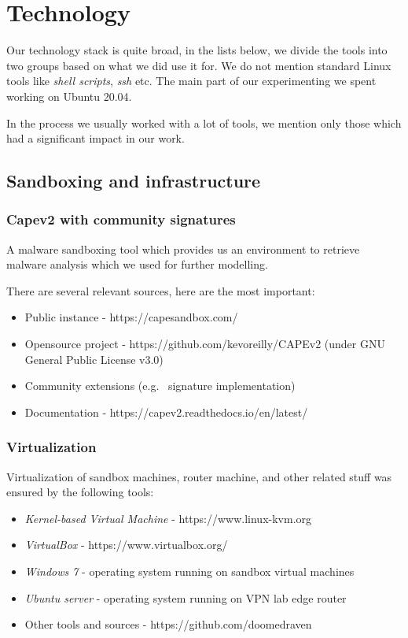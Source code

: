 \chapter{Technology} \label{app:technologies}
Our technology stack is quite broad, in the lists below, we divide the tools into two groups based on what we did use it for. We do not mention standard Linux tools like \emph{shell scripts}, \emph{ssh} etc. The main part of our experimenting we spent working on Ubuntu 20.04.

In the process we usually worked with a lot of tools, we mention only those which had a significant impact in our work.


\section*{Sandboxing and infrastructure}
\subsection*{Capev2 with community signatures}
A malware sandboxing tool which provides us an environment to retrieve malware analysis which we used for further modelling. 

There are several relevant sources, here are the most important:
\begin{itemize}
  \itemsep0em 
  \item Public instance - https://capesandbox.com/
  \item Opensource project -  https://github.com/kevoreilly/CAPEv2 (under GNU General Public License v3.0)
  \item Community extensions (e.g. \ signature implementation)
  \item Documentation - https://capev2.readthedocs.io/en/latest/
\end{itemize}

\subsection*{Virtualization}
Virtualization of sandbox machines, router machine, and other related stuff was ensured by the following tools:
\begin{itemize}
  \itemsep0em 
  \item \emph{Kernel-based Virtual Machine} - https://www.linux-kvm.org
  \item \emph{VirtualBox} - https://www.virtualbox.org/
  \item \emph{Windows 7} - operating system running on sandbox virtual machines
  \item \emph{Ubuntu server} - operating system running on VPN lab edge router
  \item Other tools and sources - https://github.com/doomedraven
\end{itemize}

